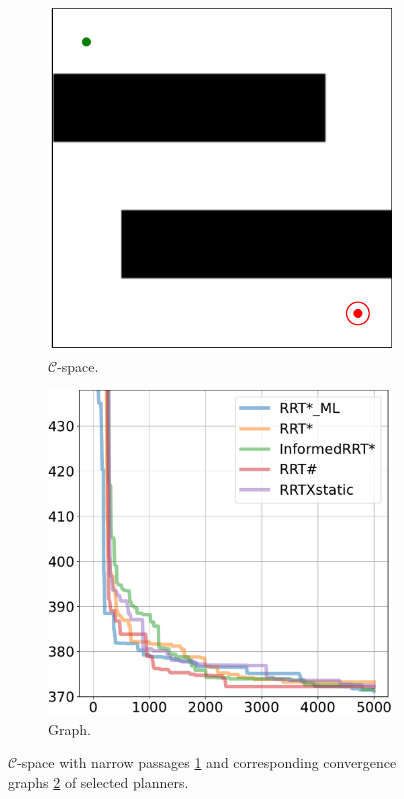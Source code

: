 \documentclass{ctuthesis}
\begin{document}
\begin{figure}[!ht]
  \centering 
  \begin{subfigure}[b]{0.48\textwidth}
      \includegraphics[width=\textwidth]{figChap5/Maze_E.pdf}
      \caption{$\mathcal{C}$-space.}
      \label{fig:maze_E_Cspace} 
  \end{subfigure}  
  \begin{subfigure}[b]{0.5\textwidth}
      \includegraphics[width=\textwidth]{figChap5/graph_E_20pt.pdf}  
      \caption{Graph.}
      \label{fig:maze_E_graphs}
  \end{subfigure}
  \caption{$\mathcal{C}$-space with narrow passages \ref{fig:maze_E_Cspace} and 
  corresponding convergence graphs \ref{fig:maze_E_graphs} of selected planners.}
  \label{fig:maze_E}
\end{figure}
\end{document}
